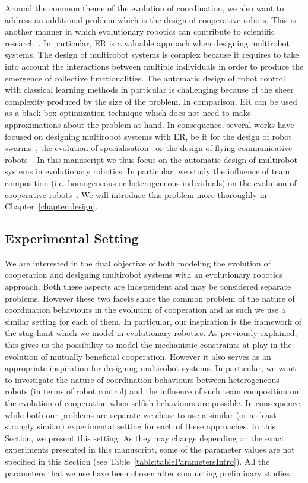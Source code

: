     Around the common theme of the evolution of coordination, we also want to address an additional problem which is the design of cooperative robots. This is another manner in which evolutionary robotics can contribute to scientific research~\parencite{Trianni2014b, Doncieux2015a}. In particular, ER is a valuable approach when designing multirobot systems. The design of multirobot systems is complex because it requires to take into account the interactions between multiple individuals in order to produce the emergence of collective functionalities. The automatic design of robot control with classical learning methods in particular is challenging because of the sheer complexity produced by the size of the problem. In comparison, ER can be used as a black-box optimization technique which does not need to make approximations about the problem at hand. In consequence, several works have focused on designing multirobot systems with ER, be it for the design of robot swarms~\parencite{Baldassarre2007}, the evolution of specialisation~\parencite{Ferrante2015} or the design of flying communicative robots~\parencite{Hauert2014}. In this manuscript we thus focus on the automatic design of multirobot systems in evolutionary robotics. In particular, we study the influence of team composition (i.e. homogeneous or heterogeneous individuals) on the evolution of cooperative robots~\parencite{Waibel2009}. We will introduce this problem more thoroughly in Chapter~\ref{chapter:design}.


  \subsection{Experimental Setting}

    We are interested in the dual objective of both modeling the evolution of cooperation and designing multirobot systems with an evolutionary robotics approach. Both these aspects are independent and may be considered separate problems. However these two facets share the common problem of the nature of coordination behaviours in the evolution of cooperation and as such we use a similar setting for each of them. In particular, our inspiration is the framework of the stag hunt which we model in evolutionary robotics. As previously explained, this gives us the possibility to model the mechanistic constraints at play in the evolution of mutually beneficial cooperation. However it also serves as an appropriate inspiration for designing multirobot systems. In particular, we want to investigate the nature of coordination behaviours between heterogeneous robots (in terms of robot control) and the influence of such team composition on the evolution of cooperation when selfish behaviours are possible. In consequence, while both our problems are separate we chose to use a similar (or at least strongly similar) experimental setting for each of these approaches. In this Section, we present this setting. As they may change depending on the exact experiments presented in this manuscript, some of the parameter values are not specified in this Section (see Table~\ref{table:tableParametersIntro}). All the parameters that we use have been chosen after conducting preliminary studies.


